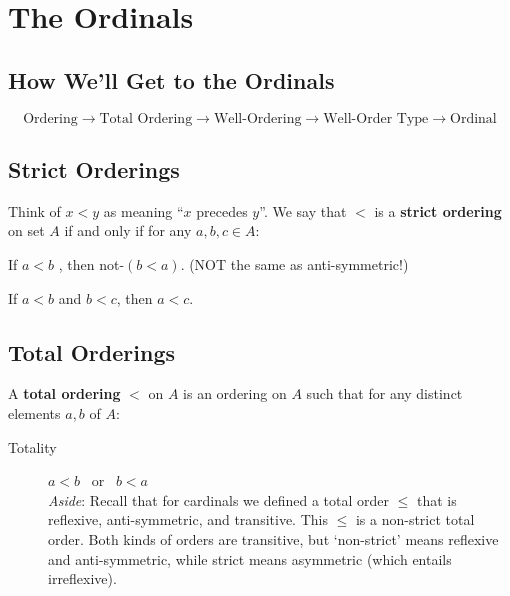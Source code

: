 \documentclass[12pt]{extarticle}
\begin{document}

 

\section{The Ordinals}

\subsection{How We'll Get to the Ordinals}

\[
\text{Ordering} \rightarrow \text{Total Ordering} \rightarrow \text{Well-Ordering} \rightarrow \text{Well-Order Type} \rightarrow \text{Ordinal}
\]


\subsection{Strict Orderings}

Think of $x < y$ as meaning ``$x$ precedes $y$''. We say that $<$ is a \textbf{strict ordering} on set $A$ if and only if for any $a,b,c \in A$:

\begin{description}\label{gloss:ordering}

\item[Asymmetry] If $a<b$ , then not-$(b < a)$. (NOT the same as anti-symmetric!)\label{gloss:asymmetry}

\item[Transitivity] If $a<b$ and $b<c$, then $a<c$.


\end{description}

\subsection{Total Orderings}

A \textbf{total ordering} $<$ on $A$ is an ordering on $A$ such that  for any distinct elements $a, b$ of $A$:


\begin{description}
\item[Totality] $a < b$ \ or \ $b < a$\\[1ex]


\textit{Aside}: Recall that for cardinals we defined a total order $\leq$ that is reflexive, anti-symmetric, and transitive. This $\leq$ is a non-strict total order. Both kinds of orders are transitive, but `non-strict' means reflexive and anti-symmetric, while strict means asymmetric (which entails irreflexive). 

\end{description}
\end{document}
